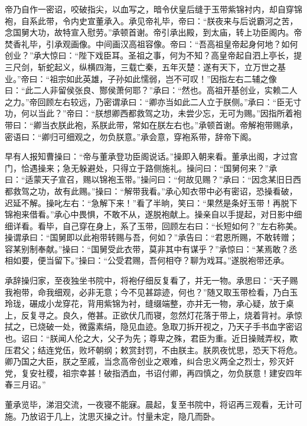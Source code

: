 帝乃自作一密诏，咬破指尖，以血写之，暗令伏皇后缝于玉带紫锦衬内，却自穿锦袍，自系此带，令内史宣董承入。承见帝礼毕，帝曰：“朕夜来与后说霸河之苦，念国舅大功，故特宣入慰劳。”承顿首谢。帝引承出殿，到太庙，转上功臣阁内。帝焚香礼毕，引承观画像。中间画汉高祖容像。帝曰：“吾高祖皇帝起身何地？如何创业？”承大惊曰：“陛下戏臣耳。圣祖之事，何为不知？高皇帝起自泗上亭长，提三尺剑，斩蛇起义，纵横四海，三载亡秦，五年灭楚：遂有天下，立万世之基业。”帝曰：“祖宗如此英雄，子孙如此懦弱，岂不可叹！”因指左右二辅之像曰：“此二人非留侯张良、酂侯萧何耶？”承曰：“然也。高祖开基创业，实赖二人之力。”帝回顾左右较远，乃密谓承曰：“卿亦当如此二人立于朕侧。”承曰：“臣无寸功，何以当此？”帝曰：“朕想卿西都救驾之功，未尝少忘，无可为赐。”因指所着袍带曰：“卿当衣朕此袍，系朕此带，常如在朕左右也。”承顿首谢。帝解袍带赐承，密语曰：“卿归可细观之，勿负朕意。”承会意，穿袍系带，辞帝下阁。

早有人报知曹操曰：“帝与董承登功臣阁说话。”操即入朝来看。董承出阁，才过宫门，恰遇操来；急无躲避处，只得立于路侧施礼。操问曰：“国舅何来？”承曰：“适蒙天子宣召，赐以锦袍玉带。”操问曰：“何故见赐？”承曰：“因念某旧日西都救驾之功，故有此赐。”操曰：“解带我看。”承心知衣带中必有密诏，恐操看破，迟延不解。操叱左右：“急解下来！”看了半晌，笑曰：“果然是条好玉带！再脱下锦袍来借看。”承心中畏惧，不敢不从，遂脱袍献上。操亲自以手提起，对日影中细细详看。看毕，自己穿在身上，系了玉带，回顾左右曰：“长短如何？”左右称美。操谓承曰：“国舅即以此袍带转赐与吾，何如？”承告曰：“君恩所赐，不敢转赠；容某别制奉献。”操曰：“国舅受此衣带，莫非其中有谋乎？”承惊曰：“某焉敢？丞相如要，便当留下。”操曰：“公受君赐，吾何相夺？聊为戏耳。”遂脱袍带还承。

承辞操归家，至夜独坐书院中，将袍仔细反复看了，并无一物。承思曰：“天子赐我袍带，命我细观，必非无意；今不见甚踪迹，何也？”随又取玉带检看，乃白玉玲珑，碾成小龙穿花，背用紫锦为衬，缝缀端整，亦并无一物，承心疑，放于桌上，反复寻之。良久，倦甚。正欲伏几而寝，忽然灯花落于带上，烧着背衬。承惊拭之，已烧破一处，微露素绢，隐见血迹。急取刀拆开视之，乃天子手书血字密诏也。诏曰：“朕闻人伦之大，父子为先；尊卑之殊，君臣为重。近日操贼弄权，欺压君父；结连党伍，败坏朝纲；敕赏封罚，不由朕主。朕夙夜忧思，恐天下将危。卿乃国之大臣，朕之至戚，当念高帝创业之艰难，纠合忠义两全之烈士，殄灭奸党，复安社稷，祖宗幸甚！破指洒血，书诏付卿，再四慎之，勿负朕意！建安四年春三月诏。”

董承览毕，涕泪交流，一夜寝不能寐。晨起，复至书院中，将诏再三观看，无计可施。乃放诏于几上，沈思灭操之计。忖量未定，隐几而卧。

